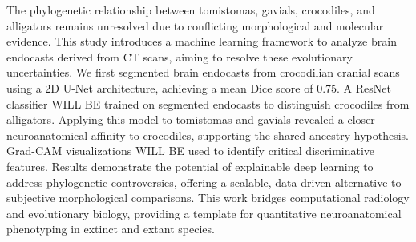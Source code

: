 The phylogenetic relationship between tomistomas, gavials, crocodiles, and alligators remains unresolved due to conflicting morphological and molecular evidence. This study introduces a machine learning framework to analyze brain endocasts derived from CT scans, aiming to resolve these evolutionary uncertainties. We first segmented brain endocasts from crocodilian cranial scans using a 2D U-Net architecture, achieving a mean Dice score of 0.75. 
A ResNet classifier WILL BE trained on segmented endocasts to distinguish crocodiles from alligators. Applying this model to tomistomas and gavials revealed a closer neuroanatomical affinity to crocodiles, supporting the shared ancestry hypothesis. Grad-CAM visualizations WILL BE used to identify critical discriminative features.
Results demonstrate the potential of explainable deep learning to address phylogenetic controversies, offering a scalable, data-driven alternative to subjective morphological comparisons. This work bridges computational radiology and evolutionary biology, providing a template for quantitative neuroanatomical phenotyping in extinct and extant species.
